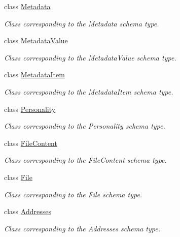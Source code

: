 \begin{DoxyCompactItemize}
class \hyperlink{classopenstack_1_1xml_1_1Metadata}{Metadata}
\begin{DoxyCompactList}\small\item\em Class corresponding to the Metadata schema type. \item\end{DoxyCompactList}\item 
class \hyperlink{classopenstack_1_1xml_1_1MetadataValue}{MetadataValue}
\begin{DoxyCompactList}\small\item\em Class corresponding to the MetadataValue schema type. \item\end{DoxyCompactList}\item 
class \hyperlink{classopenstack_1_1xml_1_1MetadataItem}{MetadataItem}
\begin{DoxyCompactList}\small\item\em Class corresponding to the MetadataItem schema type. \item\end{DoxyCompactList}\item 
class \hyperlink{classopenstack_1_1xml_1_1Personality}{Personality}
\begin{DoxyCompactList}\small\item\em Class corresponding to the Personality schema type. \item\end{DoxyCompactList}\item 
class \hyperlink{classopenstack_1_1xml_1_1FileContent}{FileContent}
\begin{DoxyCompactList}\small\item\em Class corresponding to the FileContent schema type. \item\end{DoxyCompactList}\item 
class \hyperlink{classopenstack_1_1xml_1_1File}{File}
\begin{DoxyCompactList}\small\item\em Class corresponding to the File schema type. \item\end{DoxyCompactList}\item 
class \hyperlink{classopenstack_1_1xml_1_1Addresses}{Addresses}
\begin{DoxyCompactList}\small\item\em Class corresponding to the Addresses schema type. \item\end{DoxyCompactList}\item 

\end{DoxyCompactItemize}
